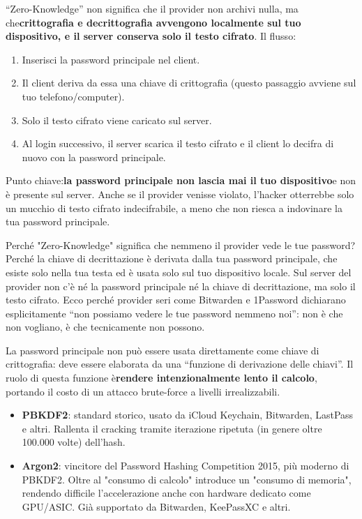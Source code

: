 
“Zero-Knowledge” non significa che il provider non archivi nulla, ma che\textbf{crittografia e decrittografia avvengono localmente sul tuo dispositivo, e il server conserva solo il testo cifrato}. Il flusso:

\begin{enumerate}
  \item Inserisci la password principale nel client.
  \item Il client deriva da essa una chiave di crittografia (questo passaggio avviene sul tuo telefono/computer).
  \item Solo il testo cifrato viene caricato sul server.
  \item Al login successivo, il server scarica il testo cifrato e il client lo decifra di nuovo con la password principale.
\end{enumerate}

Punto chiave:\textbf{la password principale non lascia mai il tuo dispositivo}e non è presente sul server. Anche se il provider venisse violato, l'hacker otterrebbe solo un mucchio di testo cifrato indecifrabile, a meno che non riesca a indovinare la tua password principale.

\begin{tcbinfo}{Perché "Zero-Knowledge" significa che nemmeno il provider vede le tue password?}
Perché la chiave di decrittazione è derivata dalla tua password principale, che esiste solo nella tua testa ed è usata solo sul tuo dispositivo locale. Sul server del provider non c'è né la password principale né la chiave di decrittazione, ma solo il testo cifrato. Ecco perché provider seri come Bitwarden e 1Password dichiarano esplicitamente “non possiamo vedere le tue password nemmeno noi”: non è che non vogliano, è che tecnicamente non possono.

\end{tcbinfo}


La password principale non può essere usata direttamente come chiave di crittografia: deve essere elaborata da una “funzione di derivazione delle chiavi”. Il ruolo di questa funzione è\textbf{rendere intenzionalmente lento il calcolo}, portando il costo di un attacco brute-force a livelli irrealizzabili.

\begin{itemize}
  \item \textbf{PBKDF2}: standard storico, usato da iCloud Keychain, Bitwarden, LastPass e altri. Rallenta il cracking tramite iterazione ripetuta (in genere oltre 100.000 volte) dell'hash.
  \item \textbf{Argon2}: vincitore del Password Hashing Competition 2015, più moderno di PBKDF2. Oltre al "consumo di calcolo" introduce un "consumo di memoria", rendendo difficile l'accelerazione anche con hardware dedicato come GPU/ASIC. Già supportato da Bitwarden, KeePassXC e altri.
\end{itemize}

